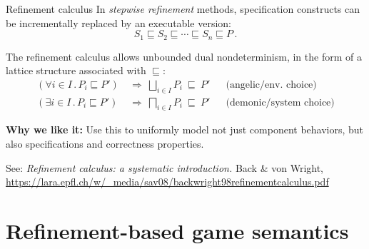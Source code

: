 \documentclass{beamer}
\begin{document}
\begin{frame}{Refinement calculus}
  In \emph{stepwise refinement} methods,
  specification constructs can be
  incrementally replaced by an executable version:
  \[
      S_1 \sqsubseteq S_2 \sqsubseteq \cdots \sqsubseteq
      S_n \sqsubseteq P \,.
  \]

  The refinement calculus allows %
  unbounded dual nondeterminism,
  in the form of a lattice structure associated with $\sqsubseteq$:
  \begin{align*}
    (\forall i \in I \,.\, P_i \sqsubseteq P')
    \: &\Rightarrow \:
    \bigsqcup_{i \in I} P_i \: \sqsubseteq \: P'
    & & \text{(angelic/env. choice)}
    \\
    (\exists i \in I \,.\, P_i \sqsubseteq P')
    \: &\Rightarrow \:
    \bigsqcap_{i \in I} P_i \: \sqsubseteq \: P'
    & & \text{(demonic/system choice)}
  \end{align*}

  \textbf{Why we like it:}
  Use this to uniformly model
  not just component behaviors,
  but also specifications and correctness properties.

  \vfill
  \small
  See: \emph{Refinement calculus: a systematic introduction.}
  Back \& von Wright,
  \tiny \url{https://lara.epfl.ch/w/_media/sav08/backwright98refinementcalculus.pdf}
\end{frame}

\section{Refinement-based game semantics}
\end{document}
